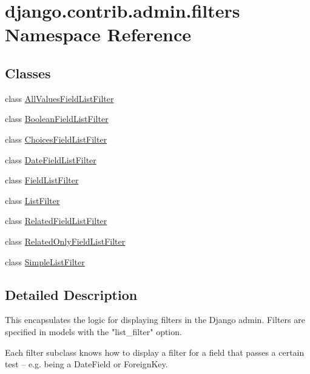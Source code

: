 \hypertarget{namespacedjango_1_1contrib_1_1admin_1_1filters}{}\section{django.\+contrib.\+admin.\+filters Namespace Reference}
\label{namespacedjango_1_1contrib_1_1admin_1_1filters}
\subsection*{Classes}
\begin{DoxyCompactItemize}
\item 
class \mbox{\hyperlink{classdjango_1_1contrib_1_1admin_1_1filters_1_1_all_values_field_list_filter}{All\+Values\+Field\+List\+Filter}}
\item 
class \mbox{\hyperlink{classdjango_1_1contrib_1_1admin_1_1filters_1_1_boolean_field_list_filter}{Boolean\+Field\+List\+Filter}}
\item 
class \mbox{\hyperlink{classdjango_1_1contrib_1_1admin_1_1filters_1_1_choices_field_list_filter}{Choices\+Field\+List\+Filter}}
\item 
class \mbox{\hyperlink{classdjango_1_1contrib_1_1admin_1_1filters_1_1_date_field_list_filter}{Date\+Field\+List\+Filter}}
\item 
class \mbox{\hyperlink{classdjango_1_1contrib_1_1admin_1_1filters_1_1_field_list_filter}{Field\+List\+Filter}}
\item 
class \mbox{\hyperlink{classdjango_1_1contrib_1_1admin_1_1filters_1_1_list_filter}{List\+Filter}}
\item 
class \mbox{\hyperlink{classdjango_1_1contrib_1_1admin_1_1filters_1_1_related_field_list_filter}{Related\+Field\+List\+Filter}}
\item 
class \mbox{\hyperlink{classdjango_1_1contrib_1_1admin_1_1filters_1_1_related_only_field_list_filter}{Related\+Only\+Field\+List\+Filter}}
\item 
class \mbox{\hyperlink{classdjango_1_1contrib_1_1admin_1_1filters_1_1_simple_list_filter}{Simple\+List\+Filter}}
\end{DoxyCompactItemize}


\subsection{Detailed Description}
\begin{DoxyVerb}This encapsulates the logic for displaying filters in the Django admin.
Filters are specified in models with the "list_filter" option.

Each filter subclass knows how to display a filter for a field that passes a
certain test -- e.g. being a DateField or ForeignKey.
\end{DoxyVerb}
 